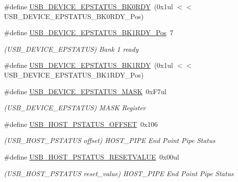 \begin{DoxyCompactItemize}
\#define \mbox{\hyperlink{group___s_a_m_d21___u_s_b_gac527be721a3068c86b8d73282d5c662a}{U\+S\+B\+\_\+\+D\+E\+V\+I\+C\+E\+\_\+\+E\+P\+S\+T\+A\+T\+U\+S\+\_\+\+B\+K0\+R\+DY}}~(0x1ul $<$$<$ U\+S\+B\+\_\+\+D\+E\+V\+I\+C\+E\+\_\+\+E\+P\+S\+T\+A\+T\+U\+S\+\_\+\+B\+K0\+R\+D\+Y\+\_\+\+Pos)
\item 
\#define \mbox{\hyperlink{group___s_a_m_d21___u_s_b_ga11d68beeb7b2fdc943fab3307da736d2}{U\+S\+B\+\_\+\+D\+E\+V\+I\+C\+E\+\_\+\+E\+P\+S\+T\+A\+T\+U\+S\+\_\+\+B\+K1\+R\+D\+Y\+\_\+\+Pos}}~7
\begin{DoxyCompactList}\small\item\em (U\+S\+B\+\_\+\+D\+E\+V\+I\+C\+E\+\_\+\+E\+P\+S\+T\+A\+T\+US) Bank 1 ready \end{DoxyCompactList}\item 
\#define \mbox{\hyperlink{group___s_a_m_d21___u_s_b_gaabcb817d2a94c1b72a8458ae7764bbc1}{U\+S\+B\+\_\+\+D\+E\+V\+I\+C\+E\+\_\+\+E\+P\+S\+T\+A\+T\+U\+S\+\_\+\+B\+K1\+R\+DY}}~(0x1ul $<$$<$ U\+S\+B\+\_\+\+D\+E\+V\+I\+C\+E\+\_\+\+E\+P\+S\+T\+A\+T\+U\+S\+\_\+\+B\+K1\+R\+D\+Y\+\_\+\+Pos)
\item 
\#define \mbox{\hyperlink{group___s_a_m_d21___u_s_b_gac8dafe05b0cfb5feff6527ae0e788ea0}{U\+S\+B\+\_\+\+D\+E\+V\+I\+C\+E\+\_\+\+E\+P\+S\+T\+A\+T\+U\+S\+\_\+\+M\+A\+SK}}~0x\+F7ul
\begin{DoxyCompactList}\small\item\em (U\+S\+B\+\_\+\+D\+E\+V\+I\+C\+E\+\_\+\+E\+P\+S\+T\+A\+T\+US) M\+A\+SK Register \end{DoxyCompactList}\item 
\#define \mbox{\hyperlink{group___s_a_m_d21___u_s_b_gaacfa6353d49fe07eb2bd0d2e67cfa3c5}{U\+S\+B\+\_\+\+H\+O\+S\+T\+\_\+\+P\+S\+T\+A\+T\+U\+S\+\_\+\+O\+F\+F\+S\+ET}}~0x106
\begin{DoxyCompactList}\small\item\em (U\+S\+B\+\_\+\+H\+O\+S\+T\+\_\+\+P\+S\+T\+A\+T\+US offset) H\+O\+S\+T\+\_\+\+P\+I\+PE End Point Pipe Status \end{DoxyCompactList}\item 
\#define \mbox{\hyperlink{group___s_a_m_d21___u_s_b_ga75bd95ebf0838b9c469b52801a6d0418}{U\+S\+B\+\_\+\+H\+O\+S\+T\+\_\+\+P\+S\+T\+A\+T\+U\+S\+\_\+\+R\+E\+S\+E\+T\+V\+A\+L\+UE}}~0x00ul
\begin{DoxyCompactList}\small\item\em (U\+S\+B\+\_\+\+H\+O\+S\+T\+\_\+\+P\+S\+T\+A\+T\+US reset\+\_\+value) H\+O\+S\+T\+\_\+\+P\+I\+PE End Point Pipe Status \end{DoxyCompactList}\item 

\end{DoxyCompactItemize}
